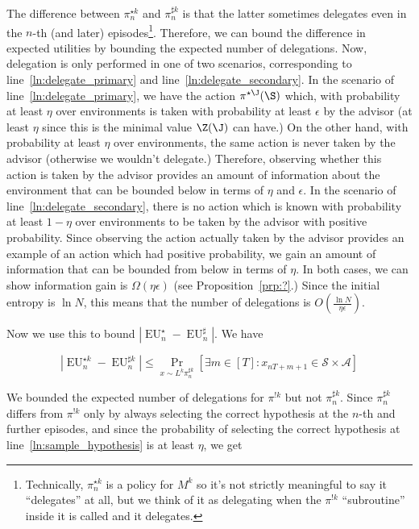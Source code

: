 \documentclass[anon,12pt]{colt2018} %
\newcommand{\AP}[1]{\left(#1\right)}
\newcommand{\AB}[1]{\left[#1\right]}
\newcommand{\Pa}[2]{\underset{#1}{\operatorname{Pr}}\AB{#2}}
\newcommand{\Abs}[1]{\left\vert #1 \right\vert}
\newcommand{\A}{\mathcal{A}}
\newcommand{\St}{\mathcal{S}}
\newcommand{\EU}{\operatorname{EU}}
\begin{document}
The difference between $\pi^{\star k}_n$ and $\pi^{\sharp k}_n$ is that the latter sometimes delegates even in the $n$-th (and later) episodes\footnote{Technically, $\pi^{\star k}_n$ is a policy for $M^k$ so it's not strictly meaningful to say it \enquote{delegates} at all, but we think of it as delegating when the $\pi^{!k}$ \enquote{subroutine} inside it is called and it delegates.}. Therefore, we can bound the difference in expected utilities by bounding the expected number of delegations. Now, delegation is only performed in one of two scenarios, corresponding to line~\ref{ln:delegate_primary} and line~\ref{ln:delegate_secondary}. In the scenario of line~\ref{ln:delegate_primary}, we have the action $\pi^{\star\J}(\S)$ which, with probability at least $\eta$ over environments is taken with probability at least $\epsilon$ by the advisor (at least $\eta$ since this is the minimal value $\Z(\J)$ can have.) On the other hand, with probability at least $\eta$ over environments, the same action is never taken by the advisor (otherwise we wouldn't delegate.) Therefore, observing whether this action is taken by the advisor provides an amount of information about the environment that can be bounded below in terms of $\eta$ and $\epsilon$. In the scenario of line~\ref{ln:delegate_secondary}, there is no action which is known with probability at least $1-\eta$ over environments to be taken by the advisor with positive probability. Since observing the action actually taken by the advisor provides an example of an action which had positive probability, we gain an amount of information that can be bounded from below in terms of $\eta$. In both cases, we can show information gain is $\Omega(\eta\epsilon)$ (see Proposition~\ref{prp:?}.) Since the initial entropy is $\ln{N}$, this means that the number of delegations is $O\AP{\frac{\ln{N}}{\eta\epsilon}}$.

Now we use this to bound $\Abs{\EU^\star_n-\EU^\sharp_n}$. We have

\begin{equation}
\Abs{\EU^{\star k}_n-\EU^{\sharp k}_n} \leq \Pa{x\sim L^k\pi^{\sharp k}_n}{\exists m \in [T]: x_{nT+m+1}\in\St \times \A}
\end{equation}

We bounded the expected number of delegations for $\pi^{!k}$ but not $\pi^{\sharp k}_n$. Since $\pi^{\sharp k}_n$ differs from $\pi^{!k}$ only by always selecting the correct hypothesis at the $n$-th and further episodes, and since the probability of selecting the correct hypothesis at line~\ref{ln:sample_hypothesis} is at least $\eta$, we get
\end{document}
